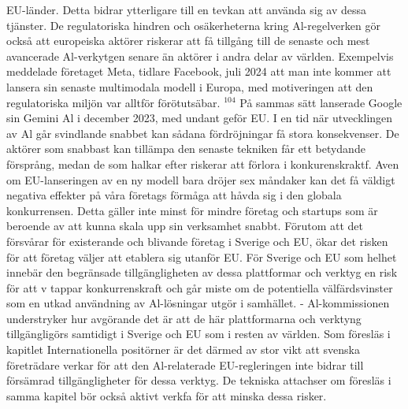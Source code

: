 {{{{{{{{EU-länder. Detta bidrar ytterligare till en tevkan att använda sig av dessa tjänster.
De regulatoriska hindren och osäkerheterna kring Al-regelverken gör också att europeiska aktörer riskerar att få tillgång till de senaste och mest avancerade Al-verkytgen senare än aktörer i andra delar av världen. Exempelvis meddelade företaget Meta, tidlare Facebook, juli 2024 att man inte kommer att lansera sin senaste multimodala modell i Europa, med motiveringen att den regulatoriska miljön var alltför förötutsäbar. \({ }^{104}\) På sammas sätt lanserade Google sin Gemini \(\mathrm{Al}\) i december 2023, med undant geför EU.
I en tid när utvecklingen av Al går svindlande snabbet kan sådana fördröjningar få stora konsekvenser. De aktörer som snabbast kan tillämpa den senaste tekniken får ett betydande försprång, medan de som halkar efter riskerar att förlora i konkurenskraktf. Aven om EU-lanseringen av en ny modell bara dröjer sex måndaker kan det få väldigt negativa effekter på våra
företags förmåga att håvda sig i den globala konkurrensen. Detta gäller inte minst för mindre företag och startups som är beroende av att kunna skala upp sin verksamhet snabbt. Förutom att det försvårar för existerande och blivande företag i Sverige och EU, ökar det risken för att företag väljer att etablera sig utanför EU. För Sverige och EU som helhet innebär den begränsade tillgängligheten av dessa plattformar och verktyg en risk för att v tappar konkurrenskraft och går miste om de potentiella välfärdsvinster som en utkad användning av Al-lösningar utgör i samhället.
- Al-kommissionen understryker hur avgörande det är att de här plattformarna och verktyng tillgängligörs samtidigt i Sverige och EU som i resten av världen. Som föresläs i kapitlet Internationella positörner är det därmed av stor vikt att svenska företrädare verkar för att den Al-relaterade EU-regleringen inte bidrar till försämrad tillgängligheter för dessa verktyg. De tekniska attachser om föresläs i samma kapitel bör också aktivt verkfa för att minska dessa risker.
}}}}}}}}
